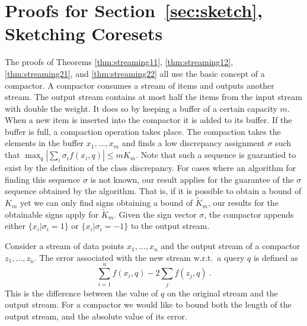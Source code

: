 \documentclass[anon,12pt]{colt2019} %
\begin{document}
{\section{Proofs for Section~\ref{sec:sketch}, Sketching Coresets} \label{app:sketch proof}


The proofs of Theorems \ref{thm:streaming11}, \ref{thm:streaming12}, \ref{thm:streaming21}, and \ref{thm:streaming22} all use the basic concept of a compactor. A compactor consumes a stream of items and outputs another stream. 
The output stream contains at most half the items from the input stream with double the weight. 
It does so by keeping a buffer of a certain capacity $m$. When a new item is inserted into the compactor it is added to its buffer. 
If the buffer is full, a compaction operation takes place. 
The compaction takes the elements in the buffer $x_1,\ldots,x_m$ and finds a low discrepancy assignment $\sigma$ such that 
$\max_q |\sum_i \sigma_i f(x_i,q)| \leq m K_m$. 
Note that such a sequence is guarantied to exist by the definition of the class discrepancy. For cases where an algorithm for finding this sequence $\sigma$ is not known, our result applies for the guarantee of the $\sigma$ sequence obtained by the algorithm. That is, if it is possible to obtain a bound of $K_m$ yet we can only find signs obtaining a bound of $\tilde{K}_m$, our results for the obtainable signs apply for $\tilde{K}_m$.
Given the sign vector $\sigma$, the compactor appends either $\{ x_i | \sigma_i = 1\}$ or  $\{ x_i | \sigma_i = -1\}$ to the output stream. 

Consider a stream of data points $x_1,\ldots,x_n$ and the output stream of a compactor $z_1,\ldots,z_{\tilde{n}}$. The error associated with the new stream w.r.t.\ a query $q$ is defined as
$$ \sum_{i=1}^n f(x_i,q) - 2\sum_j f(z_j,q) \ .$$
This is the difference between the value of $q$ on the original stream and the output stream. For a compactor we would like to bound both the length of the output stream, and the absolute value of its error.

}
\end{document}
